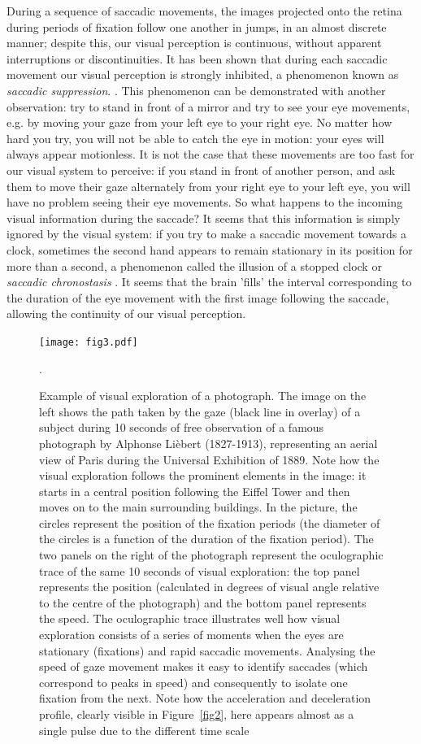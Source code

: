 \documentclass[11pt]{article}
\begin{document}
During a sequence of saccadic movements, the images projected onto the retina during periods of fixation follow one another in jumps, in an almost discrete manner; despite this, our visual perception is continuous, without apparent interruptions or discontinuities. It has been shown that during each saccadic movement our visual perception is strongly inhibited, a phenomenon known as \textit{saccadic suppression}. \cite{Volkmann1978}. This phenomenon can be demonstrated with another observation: try to stand in front of a mirror and try to see your eye movements, e.g. by moving your gaze from your left eye to your right eye. No matter how hard you try, you will not be able to catch the eye in motion: your eyes will always appear motionless. It is not the case that these movements are too fast for our visual system to perceive: if you stand in front of another person, and ask them to move their gaze alternately from your right eye to your left eye, you will have no problem seeing their eye movements. So what happens to the incoming visual information during the saccade? It seems that this information is simply ignored by the visual system: if you try to make a saccadic movement towards a clock, sometimes the second hand appears to remain stationary in its position for more than a second, a phenomenon called the illusion of a stopped clock or \textit{saccadic chronostasis} \cite{Yarrow2001}. It seems that the brain 'fills' the interval corresponding to the duration of the eye movement with the first image following the saccade, allowing the continuity of our visual perception.

\begin{figure}
\centering
\texttt{[image: fig3.pdf]}
\caption{Example of visual exploration of a photograph. The image on the left shows the path taken by the gaze (black line in overlay) of a subject during 10 seconds of free observation of a famous photograph by Alphonse Lièbert (1827-1913), representing an aerial view of Paris during the Universal Exhibition of 1889. Note how the visual exploration follows the prominent elements in the image: it starts in a central position following the Eiffel Tower and then moves on to the main surrounding buildings. In the picture, the circles represent the position of the fixation periods (the diameter of the circles is a function of the duration of the fixation period). The two panels on the right of the photograph represent the oculographic trace of the same 10 seconds of visual exploration: the top panel represents the position (calculated in degrees of visual angle relative to the centre of the photograph) and the bottom panel represents the speed. The oculographic trace illustrates well how visual exploration consists of a series of moments when the eyes are stationary (fixations) and rapid saccadic movements. Analysing the speed of gaze movement makes it easy to identify saccades (which correspond to peaks in speed) and consequently to isolate one fixation from the next. Note how the acceleration and deceleration profile, clearly visible in Figure~\ref{fig2}, here appears almost as a single pulse due to the different time scale}.
\label{fig3}
\end{figure}
\end{document}
